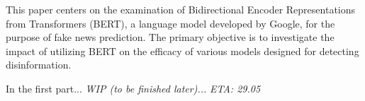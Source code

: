 This paper centers on the examination of Bidirectional Encoder Representations from Transformers (BERT), a language model developed by Google, for the purpose of fake news prediction. The primary objective is to investigate the impact of utilizing BERT on the efficacy of various models designed for detecting disinformation.


In the first part... \textit{WIP (to be finished later)...} \textit{ETA: 29.05}